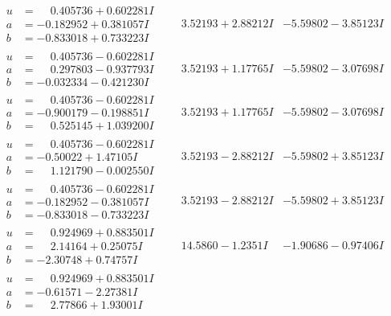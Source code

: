 \documentclass[1p]{elsarticle_modified}
\theoremstyle{definition}
\begin{document}
$$\begin{array}{c|c|c}
\begin{aligned}
u &= \phantom{-}0.405736 + 0.602281 I \\
a &= -0.182952 + 0.381057 I \\
b &= -0.833018 + 0.733223 I\end{aligned}
 & \phantom{-}3.52193 + 2.88212 I & -5.59802 - 3.85123 I \\ \hline\begin{aligned}
u &= \phantom{-}0.405736 - 0.602281 I \\
a &= \phantom{-}0.297803 - 0.937793 I \\
b &= -0.032334 - 0.421230 I\end{aligned}
 & \phantom{-}3.52193 + 1.17765 I & -5.59802 - 3.07698 I \\ \hline\begin{aligned}
u &= \phantom{-}0.405736 - 0.602281 I \\
a &= -0.900179 - 0.198851 I \\
b &= \phantom{-}0.525145 + 1.039200 I\end{aligned}
 & \phantom{-}3.52193 + 1.17765 I & -5.59802 - 3.07698 I \\ \hline\begin{aligned}
u &= \phantom{-}0.405736 - 0.602281 I \\
a &= -0.50022 + 1.47105 I \\
b &= \phantom{-}1.121790 - 0.002550 I\end{aligned}
 & \phantom{-}3.52193 - 2.88212 I & -5.59802 + 3.85123 I \\ \hline\begin{aligned}
u &= \phantom{-}0.405736 - 0.602281 I \\
a &= -0.182952 - 0.381057 I \\
b &= -0.833018 - 0.733223 I\end{aligned}
 & \phantom{-}3.52193 - 2.88212 I & -5.59802 + 3.85123 I \\ \hline\begin{aligned}
u &= \phantom{-}0.924969 + 0.883501 I \\
a &= \phantom{-}2.14164 + 0.25075 I \\
b &= -2.30748 + 0.74757 I\end{aligned}
 & \phantom{-}14.5860 - 1.2351 I & -1.90686 - 0.97406 I \\ \hline\begin{aligned}
u &= \phantom{-}0.924969 + 0.883501 I \\
a &= -0.61571 - 2.27381 I \\
b &= \phantom{-}2.77866 + 1.93001 I\end{aligned}

\end{array}$$
\end{document}
